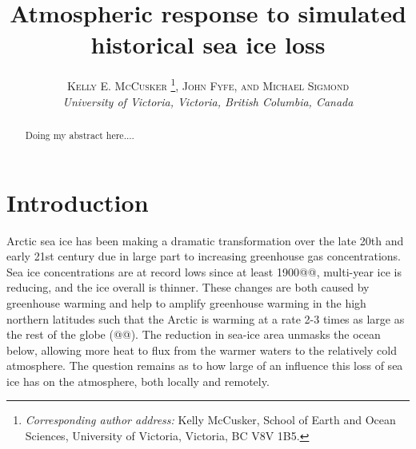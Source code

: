 \documentclass[12pt]{article}
\newcommand{\chapdef}{\section} %
\newcommand{\sectdef}{\subsection} %
\newcommand{\myabstract}{Doing my abstract here....}
\begin{document}
%
%
\title{\textbf{\large{Atmospheric response to simulated historical sea ice loss}}}
%
%
\author{\textsc{Kelly E. McCusker}
				\thanks{\textit{Corresponding author address:} 
				Kelly McCusker, School of Earth and Ocean Sciences, 
				University of Victoria, Victoria, BC V8V 1B5.
				}\quad\textsc{, John Fyfe, and Michael Sigmond}\\
\textit{\footnotesize{University of Victoria, Victoria, British Columbia, Canada}}
}
%
{
\twocolumn[
\begin{@twocolumnfalse}
\amstitle

\begin{center}
\begin{minipage}{13.0cm}
\begin{abstract}
	\myabstract
	\newline
	\begin{center}
		\rule{38mm}{0.2mm}
	\end{center}
\end{abstract}
\end{minipage}
\end{center}
\end{@twocolumnfalse}
]
}
{
\amstitle
\begin{abstract}
\myabstract
\end{abstract}
}


\chapdef{Introduction}
\label{sec:intro}
Arctic sea ice has been making a dramatic transformation over the late 20th and early 21st century due in large part to increasing greenhouse gas concentrations. Sea ice concentrations are at record lows since at least 1900@@, multi-year ice is reducing, and the ice overall is thinner. These changes are both caused by greenhouse warming and help to amplify greenhouse warming in the high northern latitudes such that the Arctic is warming at a rate 2-3 times as large as the rest of the globe (@@). The reduction in sea-ice area unmasks the ocean below, allowing more heat to flux from the warmer waters to the relatively cold atmosphere. The question remains as to how large of an influence this loss of sea ice has on the atmosphere, both locally and remotely.
\end{document}
